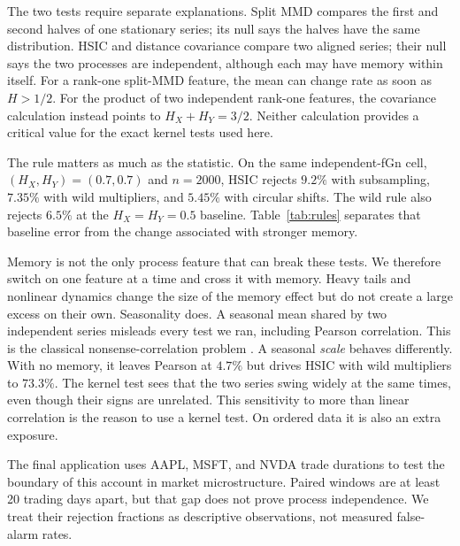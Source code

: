 \documentclass[11pt]{article}
\theoremstyle{remark}
\begin{document}
The two tests require separate explanations. Split MMD compares the first and second halves of one stationary series; its null says the halves have the same distribution. HSIC and distance covariance compare two aligned series; their null says the two processes are independent, although each may have memory within itself. For a rank-one split-MMD feature, the mean can change rate as soon as $H>1/2$. For the product of two independent rank-one features, the covariance calculation instead points to $H_X+H_Y=3/2$. Neither calculation provides a critical value for the exact kernel tests used here.

The rule matters as much as the statistic. On the same independent-fGn cell, $(H_X,H_Y)=(0.7,0.7)$ and $n=2000$, HSIC rejects $9.2\%$ with subsampling, $7.35\%$ with wild multipliers, and $5.45\%$ with circular shifts. The wild rule also rejects $6.5\%$ at the $H_X=H_Y=0.5$ baseline. Table~\ref{tab:rules} separates that baseline error from the change associated with stronger memory.

Memory is not the only process feature that can break these tests. We therefore switch on one feature at a time and cross it with memory. Heavy tails and nonlinear dynamics change the size of the memory effect but do not create a large excess on their own. Seasonality does. A seasonal mean shared by two independent series misleads every test we ran, including Pearson correlation. This is the classical nonsense-correlation problem \citep{yule1926nonsense}. A seasonal \emph{scale} behaves differently. With no memory, it leaves Pearson at $4.7\%$ but drives HSIC with wild multipliers to $73.3\%$. The kernel test sees that the two series swing widely at the same times, even though their signs are unrelated. This sensitivity to more than linear correlation is the reason to use a kernel test. On ordered data it is also an extra exposure.

The final application uses AAPL, MSFT, and NVDA trade durations to test the boundary of this account in market microstructure. Paired windows are at least 20 trading days apart, but that gap does not prove process independence. We treat their rejection fractions as descriptive observations, not measured false-alarm rates.
\end{document}
